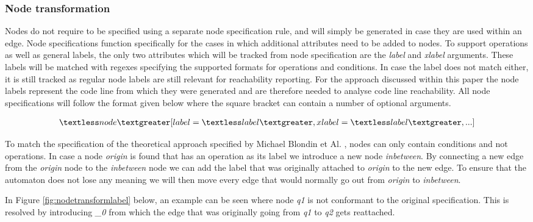 \documentclass[12pt]{article}
\begin{document}
\subsubsection{Node transformation}
Nodes do not require to be specified using a separate node specification rule, and will simply be generated in case they are used within an edge. Node specifications function specifically for the cases in which additional attributes need to be added to nodes. To support operations as well as general labels, the only two attributes which will be tracked from node specification are the \textit{label} and \textit{xlabel} arguments. These labels will be matched with regexes specifying the supported formats for operations and conditions. In case the label does not match either, it is still tracked as regular node labels are still relevant for reachability reporting. For the approach discussed within this paper the node labels represent the code line from which they were generated and are therefore needed to analyse code line reachability. All node specifications will follow the format given below where the square bracket can contain a number of optional arguments.

\begin{gather*}
\textless node \textgreater [label=\textless label\textgreater, xlabel=\textless label\textgreater, ...]
\end{gather*}

To match the specification of the theoretical approach specified by Michael Blondin et Al. \cite{blondin2021continuous}, nodes can only contain conditions and not operations. In case a node \textit{origin} is found that has an operation as its label we introduce a new node \textit{inbetween}. By connecting a new edge from the \textit{origin} node to the \textit{inbetween} node we can add the label that was originally attached to \textit{origin} to the new edge. To ensure that the automaton does not lose any meaning we will then move every edge that would normally go out from \textit{origin} to \textit{inbetween}.

In Figure \ref{fig:nodetransformlabel} below, an example can be seen where node \textit{q1} is not conformant to the original specification. This is resolved by introducing \textit{\_0} from which the edge that was originally going from \textit{q1} to \textit{q2} gets reattached.
\end{document}
